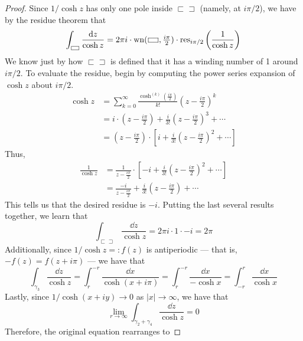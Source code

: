 \documentclass[../psets.tex]{subfiles}
\begin{document}
\begin{enumerate}[ref={A.\arabic*}]
\begin{proof}
        Since $1/\cosh z$ has only one pole inside $\sqsubset\!\sqsupset$ (namely, at $i\pi/2$), we have by the residue theorem that
        \begin{equation*}
            \int_{\sqsubset\!\sqsupset}\frac{\dd{z}}{\cosh z} = 2\pi i\cdot\operatorname{wn}(\sqsubset\!\sqsupset,\tfrac{i\pi}{2})\cdot\operatorname{res}_{i\pi/2}\left( \frac{1}{\cosh z} \right)
        \end{equation*}
        We know just by how $\sqsubset\!\sqsupset$ is defined that it has a winding number of 1 around $i\pi/2$. To evaluate the residue, begin by computing the power series expansion of $\cosh z$ about $i\pi/2$.
        \begin{align*}
            \cosh z &= \sum_{k=0}^\infty\frac{\cosh^{(k)}(\tfrac{i\pi}{2})}{k!}(z-\tfrac{i\pi}{2})^k\\
            &= i\cdot(z-\tfrac{i\pi}{2})+\frac{i}{3!}(z-\tfrac{i\pi}{2})^3+\cdots\\
            &= (z-\tfrac{i\pi}{2})\cdot\left[ i+\frac{i}{3!}(z-\tfrac{i\pi}{2})^2+\cdots \right]
        \end{align*}
        Thus,
        \begin{align*}
            \frac{1}{\cosh z} &= \frac{1}{z-\tfrac{i\pi}{2}}\cdot\left[ -i+\frac{i}{3!}(z-\tfrac{i\pi}{2})^2+\cdots \right]\\
            &= \frac{-i}{z-\tfrac{i\pi}{2}}+\frac{i}{3!}(z-\tfrac{i\pi}{2})+\cdots
        \end{align*}
        This tells us that the desired residue is $-i$. Putting the last several results together, we learn that
        \begin{equation*}
            \int_{\sqsubset\!\sqsupset}\frac{\dd{z}}{\cosh z} = 2\pi i\cdot 1\cdot -i
            = 2\pi
        \end{equation*}
        Additionally, since $1/\cosh z=:f(z)$ is antiperiodic --- that is, $-f(z)=f(z+i\pi)$ --- we have that
        \begin{equation*}
            \int_{\gamma_3}\frac{\dd{z}}{\cosh z} = \int_r^{-r}\frac{\dd{x}}{\cosh(x+i\pi)}
            = \int_r^{-r}\frac{\dd{x}}{-\cosh x}
            = \int_{-r}^r\frac{\dd{x}}{\cosh x}
        \end{equation*}
        Lastly, since $1/\cosh(x+iy)\to 0$ as $|x|\to\infty$, we have that
        \begin{equation*}
            \lim_{r\to\infty}\int_{\gamma_2+\gamma_4}\frac{\dd{z}}{\cosh z} = 0
        \end{equation*}
        Therefore, the original equation rearranges to

\end{proof}
\end{enumerate}
\end{document}

